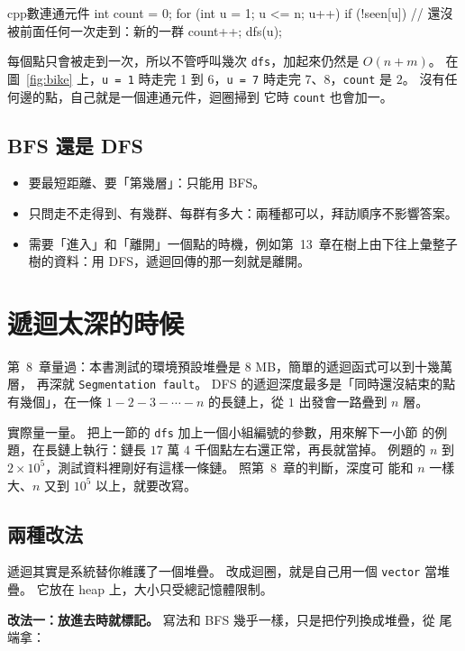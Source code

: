 \begin{code}{cpp}{數連通元件}
int count = 0;
for (int u = 1; u <= n; u++) {
    if (!seen[u]) {          // 還沒被前面任何一次走到：新的一群
        count++;
        dfs(u);
    }
}
\end{code}

每個點只會被走到一次，所以不管呼叫幾次 \texttt{dfs}，加起來仍然是 $O(n + m)$。
在圖~\ref{fig:bike} 上，\texttt{u = 1} 時走完 1 到 6，\texttt{u = 7} 時走完
7、8，\texttt{count} 是 $2$。 沒有任何邊的點，自己就是一個連通元件，迴圈掃到
它時 \texttt{count} 也會加一。

\subsection{BFS 還是 DFS}

\begin{itemize}
\item 要最短距離、要「第幾層」：只能用 BFS。
\item 只問走不走得到、有幾群、每群有多大：兩種都可以，拜訪順序不影響答案。
\item 需要「進入」和「離開」一個點的時機，例如第~13~章在樹上由下往上彙整子
樹的資料：用 DFS，遞迴回傳的那一刻就是離開。
\end{itemize}

\section{遞迴太深的時候}
\label{sec:dfs-iterative}

第~8~章量過：本書測試的環境預設堆疊是 $8$ MB，簡單的遞迴函式可以到十幾萬層，
再深就 \texttt{Segmentation fault}。 DFS 的遞迴深度最多是「同時還沒結束的點
有幾個」，在一條 $1 - 2 - 3 - \cdots - n$ 的長鏈上，從 $1$ 出發會一路疊到 $n$
層。

實際量一量。 把上一節的 \texttt{dfs} 加上一個小組編號的參數，用來解下一小節
的例題，在長鏈上執行：鏈長 $17$ 萬 $4$ 千個點左右還正常，再長就當掉。 例題的
$n$ 到 $2 \times 10^5$，測試資料裡剛好有這樣一條鏈。 照第~8~章的判斷，深度可
能和 $n$ 一樣大、$n$ 又到 $10^5$ 以上，就要改寫。

\subsection{兩種改法}

遞迴其實是系統替你維護了一個堆疊。 改成迴圈，就是自己用一個
\texttt{vector} 當堆疊。 它放在 heap 上，大小只受總記憶體限制。

\textbf{改法一：放進去時就標記。} 寫法和 BFS 幾乎一樣，只是把佇列換成堆疊，從
尾端拿：

